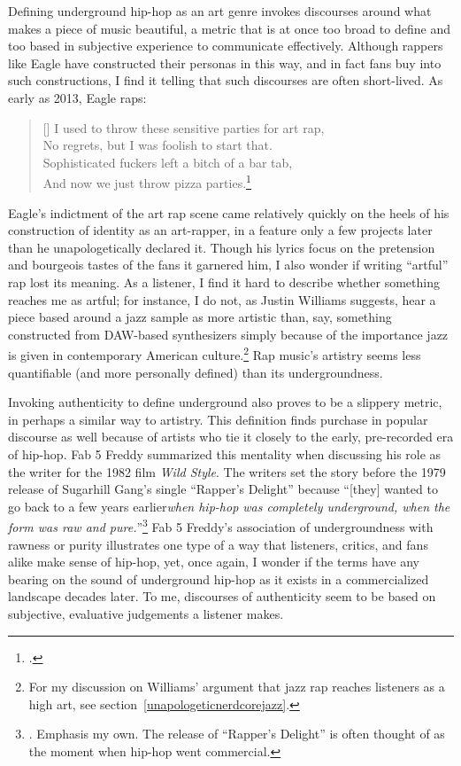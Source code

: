 Defining underground hip-hop as an art genre invokes discourses around what makes a piece 
of music beautiful, a metric that is at once too broad to define and too based in subjective
experience to communicate effectively. Although rappers like Eagle have constructed their 
personas in this way, and in fact fans buy into such constructions, I find it telling that 
such discourses are often short-lived. As early as 2013, Eagle raps:

\settowidth{\versewidth}{I used to throw these sensitive parties for art rap,}
    \begin{verse}[\versewidth]
        \small I used to throw these sensitive parties for art rap, \\
        \small No regrets, but I was foolish to start that. \\
        \small Sophisticated fuckers left a bitch of a bar tab, \\
        \small And now we just throw pizza parties.\footnote{
        \cite{milo2013}.}
    \end{verse}
Eagle's indictment of the art rap scene came relatively quickly on the heels of his 
construction of identity as an art-rapper, in a feature only a few projects later than
he unapologetically declared it. Though his lyrics focus on the pretension and bourgeois
tastes of the fans it garnered him, I also  wonder if writing ``artful'' rap lost its 
meaning. As a listener, I find it hard to describe whether something reaches me as artful;
for instance, I do not, as Justin Williams suggests, hear a piece based around a jazz sample
as more artistic than, say, something constructed from DAW-based synthesizers simply because
of the importance jazz is given in contemporary American culture.\footnote{
    For my discussion on Williams' argument that jazz rap reaches listeners as a  high art, 
    see section~\ref{unapologeticnerdcorejazz}.} 
Rap music's artistry seems less quantifiable (and more personally defined) than its undergroundness.

Invoking authenticity to define underground also proves to be a slippery metric, in perhaps a 
similar way to artistry. This definition finds purchase in popular discourse as well because of
artists who tie it closely to the early, pre-recorded era of hip-hop. Fab 5 Freddy summarized 
this mentality when discussing  his role as the writer for the 1982 film \textit{Wild Style}. 
The writers set the story before the 1979 release of Sugarhill Gang's single ``Rapper's Delight'' 
because ``[they] wanted to go back to a few years earlier\textellipsis \emph{when hip-hop was 
completely underground, when the form was raw and pure.}''\footnote{
    \autocite[23]{justinawilliamsRhyminStealinMusical2013}. Emphasis my own. The release
    of ``Rapper's Delight'' is often thought of as the moment when hip-hop went commercial.}
Fab 5 Freddy's association of undergroundness with rawness or purity illustrates one type
of a way that listeners, critics, and fans alike make sense of hip-hop, yet, once again, I 
wonder if the terms have any bearing on the sound of underground hip-hop as it exists in a
commercialized landscape decades later. To me, discourses of authenticity seem to be based 
on subjective, evaluative judgements a listener makes.


